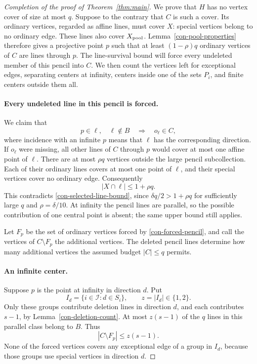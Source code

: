 \begin{proof}[Completion of the proof of Theorem~\ref{thm:main}]
We prove that \(H\) has no vertex cover of size at most \(q\).
Suppose to the contrary that \(C\) is such a cover.  Its ordinary
vertices, regarded as affine lines, must cover \(X\): special
vertices belong to no ordinary edge.  These lines also cover
\(X_{\rm pool}\).  Lemma~\ref{con-pool-properties} therefore
gives a projective point \(p\) such that at least
\((1-\rho)q\) ordinary vertices of \(C\) are lines through
\(p\).  The line-survival bound will force every undeleted member
of this pencil into \(C\).  We then count the vertices left for
exceptional edges, separating centers at infinity, centers inside one
of the sets \(P_i\), and finite centers outside them all.

\paragraph{Every undeleted line in this pencil is forced.}
We claim that
\begin{equation}
\label{con-forced-pencil}
 p\in\ell,\quad\ell\notin B
 \quad\Longrightarrow\quad o_\ell\in C,
\end{equation}
where incidence with an infinite \(p\) means that \(\ell\) has
the corresponding direction.  If \(o_\ell\) were missing, all
other lines of \(C\) through \(p\) would cover at most one
affine point of \(\ell\).  There are at most \(\rho q\)
vertices outside the large pencil subcollection.  Each of their
ordinary lines covers at most one point of \(\ell\), and their
special vertices cover no ordinary edge.  Consequently
\[
 |X\cap\ell|\le1+\rho q.
\]
This contradicts \eqref{con-selected-line-bound}, since
\(\delta q/2>1+\rho q\) for sufficiently large \(q\) and
\(\rho=\delta/10\).  At infinity the pencil lines are parallel,
so the possible contribution of one central point is absent; the
same upper bound still applies.

Let \(F_p\) be the set of ordinary vertices forced by
\eqref{con-forced-pencil}, and call the vertices of \(C\setminus F_p\)
the additional vertices.  The deleted pencil lines determine how
many additional vertices the assumed budget \(|C|\le q\) permits.

\paragraph{An infinite center.}
Suppose \(p\) is the point at infinity in direction \(d\).  Put
\[
 I_d=\{i\in\mathcal I:d\in S_i\},
 \qquad z=|I_d|\in\{1,2\}.
\]
Only these groups contribute deletion lines in direction \(d\),
and each contributes \(s-1\), by
Lemma~\ref{con-deletion-count}.  At most \(z(s-1)\) of the
\(q\) lines in this parallel class belong to \(B\).  Thus
\[
 |C\setminus F_p|\le z(s-1).
\]
None of the forced vertices covers any exceptional edge of a group
in \(I_d\), because those groups use special vertices in
direction \(d\).


\end{proof}
